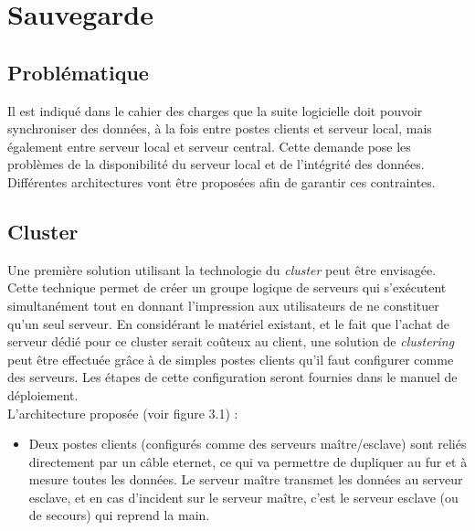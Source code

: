 \section{Sauvegarde}

\label{SauvegardeTechnique}

% 

\subsection{Problématique}

Il est indiqué dans le cahier des charges que la suite logicielle doit pouvoir synchroniser des données, à la fois entre postes clients et serveur local, mais également entre serveur local et serveur central.
Cette demande pose les problèmes de la disponibilité du serveur local et de l'intégrité des données. Différentes architectures vont être proposées afin de garantir ces contraintes.

\subsection{Cluster}

Une première solution utilisant la technologie du \textit{cluster} peut être envisagée. Cette technique permet de créer un groupe logique de serveurs qui s'exécutent simultanément tout en donnant l'impression aux utilisateurs de ne constituer qu'un seul serveur.
En considérant le matériel existant, et le fait que l'achat de serveur dédié pour ce cluster serait coûteux au client, une solution de \textit{clustering} peut être effectuée grâce à de simples postes clients qu'il faut configurer comme des serveurs. Les étapes de cette configuration seront fournies dans le manuel de déploiement.
\\
L'architecture proposée (voir figure 3.1) :
\begin{itemize}
	\item Deux postes clients (configurés comme des serveurs maître/esclave) sont reliés directement par un câble eternet, ce qui va permettre de dupliquer au fur et à mesure toutes les données. Le serveur maître transmet les données au serveur esclave, et en cas d'incident sur le serveur maître, c'est le serveur esclave (ou de secours) qui reprend la main.
\end{itemize}



